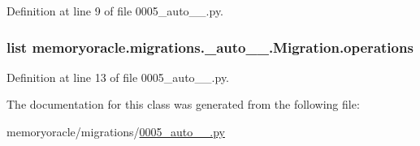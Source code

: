 Definition at line 9 of file 0005\+\_\+auto\+\_\+\_.\+py.

\hypertarget{classmemoryoracle_1_1migrations_1_10005__auto__20150403__0100_1_1Migration_abf5a9879371a9a8c7a622e36323d7115}{}
\subsubsection[{operations}]{\setlength{\rightskip}{0pt plus 5cm}list memoryoracle.\+migrations.\+\_\+auto\+\_\+\_.\+Migration.\+operations\hspace{0.3cm}{\ttfamily [static]}}\label{classmemoryoracle_1_1migrations_1_10005__auto__20150403__0100_1_1Migration_abf5a9879371a9a8c7a622e36323d7115}


Definition at line 13 of file 0005\+\_\+auto\+\_\+\_.\+py.



The documentation for this class was generated from the following file\+:\begin{DoxyCompactItemize}
\item 
memoryoracle/migrations/\hyperlink{0005__auto__20150403__0100_8py}{0005\+\_\+auto\+\_\+\_.\+py}\end{DoxyCompactItemize}
